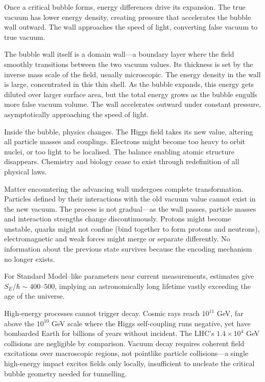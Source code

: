 Once a critical bubble forms, energy differences drive its expansion. The true vacuum has lower energy density, creating pressure that accelerates the bubble wall outward. The wall approaches the speed of light, converting false vacuum to true vacuum.

The bubble wall itself is a domain wall—a boundary layer where the field smoothly transitions between the two vacuum values. Its thickness is set by the inverse mass scale of the field, usually microscopic. The energy density in the wall is large, concentrated in this thin shell. As the bubble expands, this energy gets diluted over larger surface area, but the total energy grows as the bubble engulfs more false vacuum volume. The wall accelerates outward under constant pressure, asymptotically approaching the speed of light.

Inside the bubble, physics changes. The Higgs field takes its new value, altering all particle masses and couplings. Electrons might become too heavy to orbit nuclei, or too light to be localised. The balance enabling atomic structure disappears. Chemistry and biology cease to exist through redefinition of all physical laws.

Matter encountering the advancing wall undergoes complete transformation. Particles defined by their interactions with the old vacuum value cannot exist in the new vacuum. The process is not gradual—as the wall passes, particle masses and interaction strengths change discontinuously. Protons might become unstable, quarks might not confine (bind together to form protons and neutrons), electromagnetic and weak forces might merge or separate differently. No information about the previous state survives because the encoding mechanism no longer exists.

For Standard Model–like parameters near current measurements, estimates give $S_E/\hbar \sim 400$–$500$, implying an astronomically long lifetime vastly exceeding the age of the universe.

High-energy processes cannot trigger decay. Cosmic rays reach $10^{11}$ GeV, far above the $10^{10}$ GeV scale where the Higgs self-coupling runs negative, yet have bombarded Earth for billions of years without incident. The LHC's $1.4 \times 10^4$ GeV collisions are negligible by comparison. Vacuum decay requires coherent field excitations over macroscopic regions, not pointlike particle collisions—a single high-energy impact excites fields only locally, insufficient to nucleate the critical bubble geometry needed for tunnelling.

